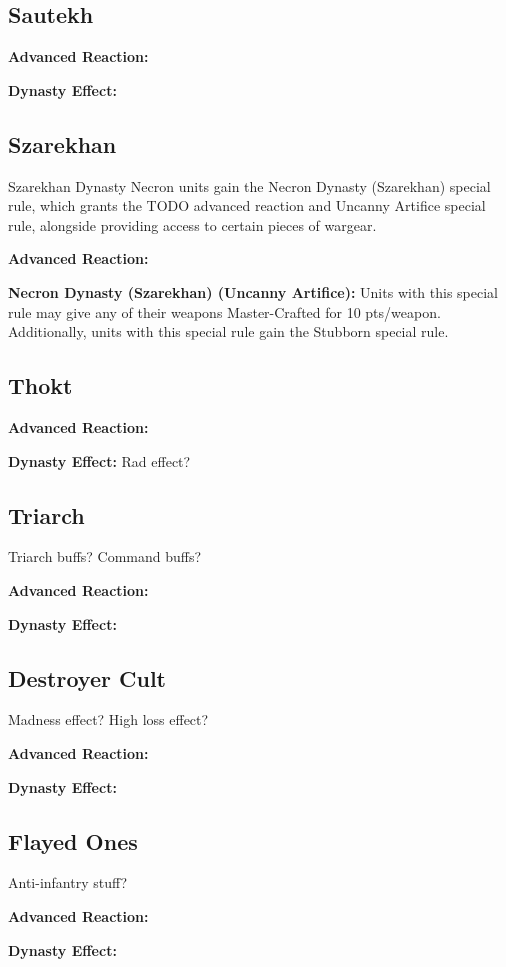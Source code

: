\subsection{Sautekh}


\textbf{Advanced Reaction:}

\textbf{Dynasty Effect:}


\subsection{Szarekhan}

Szarekhan Dynasty Necron units gain the Necron Dynasty (Szarekhan) special rule, which grants the TODO advanced reaction and Uncanny Artifice special rule, alongside providing access to certain pieces of wargear.

\textbf{Advanced Reaction:}

\textbf{Necron Dynasty (Szarekhan) (Uncanny Artifice):} Units with this special rule may give any of their weapons Master-Crafted for 10 pts/weapon. Additionally, units with this special rule gain the Stubborn special rule.


\subsection{Thokt}

\textbf{Advanced Reaction:}

\textbf{Dynasty Effect:} Rad effect?


\subsection{Triarch}

Triarch buffs? Command buffs?

\textbf{Advanced Reaction:}

\textbf{Dynasty Effect:}


\subsection{Destroyer Cult}

Madness effect? High loss effect?

\textbf{Advanced Reaction:}

\textbf{Dynasty Effect:}


\subsection{Flayed Ones}

Anti-infantry stuff?

\textbf{Advanced Reaction:}

\textbf{Dynasty Effect:}